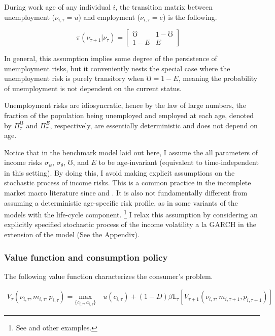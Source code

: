During work age of any individual $i$, the transition matrix between unemployment ($\nu_{i,\tau}=u$) and employment ($\nu_{i,\tau} = e$) is the following.

\begin{equation}
\pi(\nu_{\tau+1}|\nu_{\tau})= 
    \begin{bmatrix} 
	\mho & 1-\mho  \\
	1-E & E
	\end{bmatrix}
	\quad
\end{equation}

In general, this assumption implies some degree of the persistence of unemployment risks, but it conveniently nests the special case where the unemployment risk is purely transitory when $\mho = 1-E$, meaning the probability of unemployment is not dependent on the current status. 


Unemployment risks are idiosyncratic, hence by the law of large numbers, the fraction of the population being unemployed and employed at each age, denoted by $\Pi^\mho_\tau$ and $\Pi^E_\tau$, respectively, are essentially deterministic and does not depend on age.  

Notice that in the benchmark model laid out here, I assume the all parameters of income risks $\sigma_\psi$, $\sigma_\theta$, $\mho$, and $E$ to be age-invariant (equivalent to time-independent in this setting). By doing this, I avoid making explicit assumptions on the stochastic process of income risks. This is a common practice in the incomplete market macro literature since    \cite{gourinchas2002consumption} and \cite{cagetti2003wealth}. It is also not fundamentally different from assuming a deterministic age-specific risk profile, as in some variants of the models with the life-cycle component. \footnote{See \cite{carroll2017distribution} and other examples.} I relax this assumption by considering an explicitly specified stochastic process of the income volatility a la GARCH in the extension of the model (See the Appendix). 

\subsubsection{Value function and consumption policy}

The following value function characterizes the  consumer's problem.

\begin{equation}
\begin{split}
V_{\tau}(\nu_{i,\tau}, m_{i,\tau}, p_{i,\tau}) = \underset{\{c_{i,\tau},a_{i,\tau}\}}{\textrm{max}} \quad u(c_{i,\tau}) + (1-D)\beta \mathbb{E}_{\tau}\left[V_{\tau+1}(\nu_{i,\tau},m_{i,\tau+1}, p_{i,\tau+1})\right] 
\end{split}
\end{equation}

